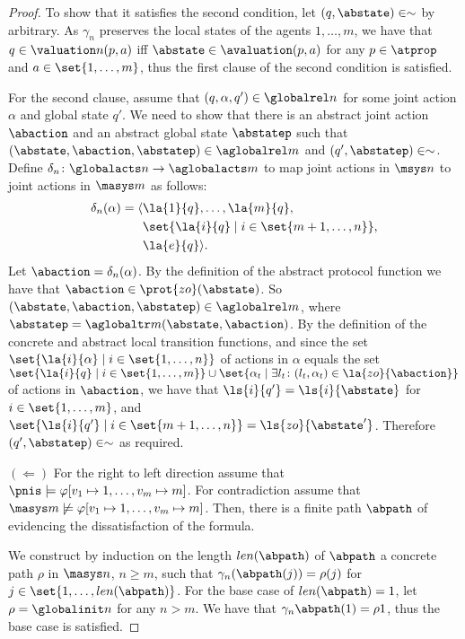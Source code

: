 \begin{proof}
To show that it satisfies the second condition, let $(q, \abstate) \in \sim$ by
arbitrary. As $\gamma_n$ preserves the local states of the agents $1, \ldots,
m$, we have that $q \in \valuation n(p, a)$ iff $\abstate \in \avaluation(p, a)$
for any $p \in \atprop$ and $a \in \set{1, \ldots, m}$, thus the first clause of
the second condition is satisfied. 

For the second clause,  assume that $(q,
\alpha, q') \in \globalrel n$ for some joint action $\alpha$ and global state
$q'$. We need to show that there is an abstract joint action $\abaction$ and
an abstract global state $\abstatep$ such that $(\abstate, \abaction, \abstatep) \in
\aglobalrel m$ and $(q', \abstatep) \in \sim$.  Define $\delta_n \colon
\globalacts n \rightarrow \aglobalacts m$ to map joint actions in $\msys n$ to
joint actions in $\masys m$ as follows:
\begin{align*}
  \delta_n(\alpha) =  \langle &\la{1}{q}, \ldots, \la{m}{q}, \\
  &\set{\la{i}{q} \mid i \in \set{m + 1, \ldots, n}}, \\
  &\la{e}{q}  \rangle.
\end{align*}
Let $\abaction = \delta_n(\alpha)$. By the definition of the abstract protocol
function we have that $\abaction \in \prot{zo}(\abstate)$. So $(\abstate,
\abaction, \abstatep) \in \aglobalrel m$, where $\abstatep = \aglobaltr m
(\abstate, \abaction)$. By the definition of the concrete and abstract local
transition functions, and since the set $\set{\la{i}{\alpha} \mid i \in
\set{1,\ldots,n}}$ of actions in $\alpha$ equals the set $\set{\la{i}{q} \mid i
\in \set{1,\ldots,m}} \cup \set{\alpha_t \mid \exists l_t \colon (l_t, \alpha_t)
\in \la{zo}{\abaction}}$ of actions in $\abaction$, we have that $\ls{i}{q'} =
\ls{i}{\abstate}$ for $i \in \set{1,\ldots,m}$, and $\set{\ls{i}{q'} \mid i \in
\set{m+1,\ldots,n}} = \ls{zo}{\abstate'}$. Therefore $(q', \abstatep) \in \sim$
as required.



$\boldsymbol{(\Longleftarrow)}$  For the right to left direction  assume that
$\pnis \models  \varphi[v_1 \mapsto 1, \ldots, v_m \mapsto m]$. For
contradiction assume that $\masys m \not \models \varphi[v_1 \mapsto 1, \ldots,
v_m \mapsto m]$.  Then, there is a finite path $\abpath$
of evidencing the dissatisfaction of the formula. 

We construct by induction on the length $len(\abpath)$ of $\abpath$ a concrete
path $\rho$ in $\masys n$, $n \geq m$, such that $\gamma_n(\abpath(j)) =
\rho(j)$ for $j \in \set{1,\ldots,len(\abpath)}$.  For the base case of
$len(\abpath)=1$, let $\rho = \globalinit n$ for any $n > m$.  We have that
$\gamma_n{\abpath(1)} = \rho{1}$, thus the
base case is satisfied.


\end{proof}
